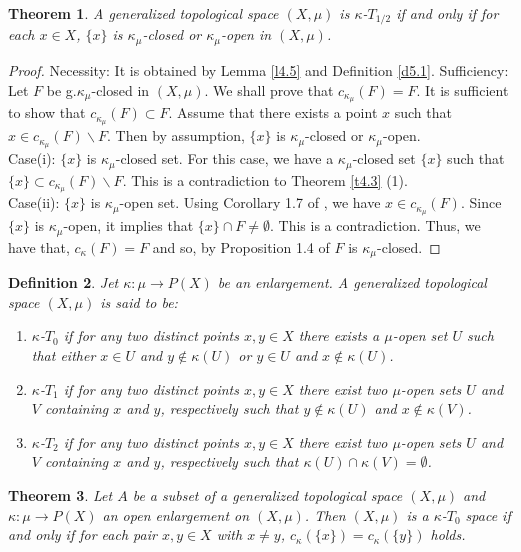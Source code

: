 \documentclass{matua}
\newtheorem{theorem}{Theorem}[section]
\newtheorem{definition}[theorem]{Definition}
\begin{document}
\begin{theorem}\label{t2}
A generalized topological space $(X, \mu)$ is $\kappa$-$T_{1/2}$ if and only if for each $x\in X$, $\{x\}$ is $\kappa_\mu$-closed or $\kappa_\mu$-open in $(X, \mu)$.
\end{theorem}
\begin{proof}
Necessity: It is obtained by Lemma \ref{l4.5} and Definition \ref{d5.1}.
Sufficiency: Let $F$ be g.$\kappa_\mu$-closed in $(X, \mu)$. We shall prove that $c_{\kappa_\mu}(F) = F$. It is sufficient to show that $c_{\kappa_\mu}(F) \subset F$. Assume that there exists a point $x$ such that $x \in c_{\kappa_\mu}(F)\backslash F$. Then by assumption, $\{x\}$ is $\kappa_\mu$-closed or $\kappa_\mu$-open.\\
Case(i): $\{x\}$ is $\kappa_\mu$-closed set. For this case, we have a $\kappa_\mu$-closed set $\{x\}$ such that $\{x\} \subset c_{\kappa_\mu}(F) \backslash F$. This is a contradiction to Theorem \ref{t4.3} (1). \\
Case(ii): $\{x\}$ is $\kappa_\mu$-open set. Using Corollary 1.7 of \cite{cs3}, we have $x\in c_{\kappa_\mu}(F)$. Since $\{x\}$ is $\kappa_\mu$-open, it implies that $\{x\} \cap F \neq \emptyset$. This is a contradiction. Thus, we have that, $c_{\kappa}(F) = F$ and so, by Proposition 1.4 of \cite{cs3} $F$ is $\kappa_\mu$-closed.
\end{proof}
\begin{definition}\label{d3.2}
Jet $\kappa: \mu\rightarrow P(X)$ be an enlargement. A generalized topological space $(X, \mu)$ is said to be:
\begin{enumerate}
\item $\kappa$-$T_0$ if for any two distinct points $x, y\in X$ there exists a $\mu$-open set $U$ such that either $x\in U$ and $y\notin \kappa (U)$ or $y\in U$ and $x\notin \kappa (U)$.
\item $\kappa$-$T_1$ if for any two distinct points $x, y\in X$ there exist two $\mu$-open sets $U$ and $V$ containing $x$ and $y$, respectively such that $y\notin \kappa (U)$ and $x\notin \kappa (V)$.
\item $\kappa$-$T_2$ if for any two distinct points $x, y\in X$ there exist two $\mu$-open sets $U$ and $V$ containing $x$ and $y$, respectively such that $\kappa (U)\cap \kappa (V) = \emptyset$.
\end{enumerate}
\end{definition}
\begin{theorem}
Let $A$ be a subset of a generalized topological space $(X, \mu)$ and $\kappa :  \mu\rightarrow P(X)$ an open enlargement on $(X, \mu)$. Then $(X, \mu)$ is a $\kappa$-$T_0$ space if and only if for each pair $x, y\in X$ with $x \neq y$, $c_\kappa(\{x\}) = c_\kappa(\{y\})$ holds.
\end{theorem}
\end{document}
